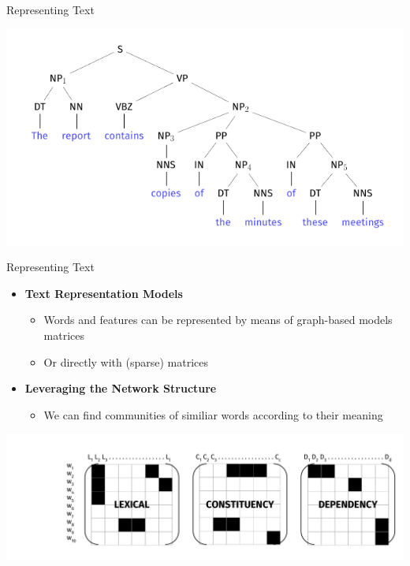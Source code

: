 \documentclass[10pt,xcolor=table]{beamer}
\begin{document}
\begin{frame}{Representing Text}
\begin{overprint}
	  \centering
      \includegraphics[width=.8\linewidth]{img/tree/tree.pdf}
\end{overprint}


\end{frame}

\begin{frame}{Representing Text}
\begin{itemize}
\item \textbf{Text Representation Models}
	\begin{itemize}
		\item Words and features can be represented by means of graph-based models  matrices
		\item Or directly with (sparse) matrices
	\end{itemize}
\item \textbf{Leveraging the Network Structure}
	\begin{itemize}
		\item We can find communities of similiar words according to their meaning
	\end{itemize}
\end{itemize}
\begin{overprint}
	  \centering
	      \includegraphics[width=.8\linewidth]{image2/Chapitre1/feature_types.pdf}	
\end{overprint}

\end{frame}
\end{document}
